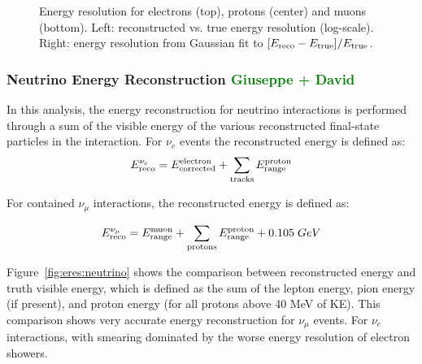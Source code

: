 \documentclass[a4paper]{article}
\begin{document}
\begin{figure}[H]
\begin{center}
\begin{subfigure}[b]{0.38\textwidth}
    \end{subfigure}
\caption{\label{fig:eres:particle}Energy resolution for electrons (top), protons (center) and muons (bottom). Left: reconstructed vs. true energy resolution (log-scale). Right: energy resolution from Gaussian fit to $[E_{\rm reco}-E_{\rm true}] / E_{\rm true}$.}
\end{center}
\end{figure}

\newpage

\subsubsection{Neutrino Energy Reconstruction \textcolor{green}{Giuseppe + David}}

\par In this analysis, the energy reconstruction for neutrino interactions is performed through a sum of the visible energy of the various reconstructed final-state particles in the interaction. For $\nu_e$ events the reconstructed energy is defined as:
\begin{equation}
    E_{\rm reco}^{\nu_e} = E_{\rm corrected}^{\rm electron} + \sum_{\rm tracks} E_{\rm range}^{\rm proton}
\end{equation}{}

For contained $\nu_{\mu}$ interactions, the reconstructed energy is defined as:

\begin{equation}
    E_{\rm reco}^{\nu_{\mu}} = E_{\rm range}^{\rm muon} + \sum_{\rm protons} E_{\rm range}^{\rm proton} + 0.105 \; GeV
\end{equation}{}

Figure~\ref{fig:eres:neutrino} shows the comparison between reconstructed energy and truth visible energy, which is defined as the sum of the lepton energy, pion energy (if present), and proton energy (for all protons above 40 MeV of KE). This comparison shows very accurate energy reconstruction for $\nu_{\mu}$ events. For $\nu_e$ interactions, with smearing dominated by the worse energy resolution of electron showers.
\end{document}
